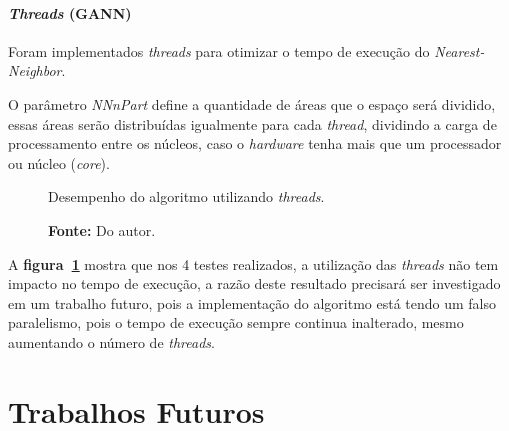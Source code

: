 \documentclass[12pt,openright,a4paper,twoside]{tcc}
\begin{document}
			\subsubsection{\textit{Threads} (GANN)}

			Foram implementados \textit{threads} para otimizar o tempo de execução do \textit{Nearest-Neighbor}. 

			O parâmetro \textit{NNnPart} define a quantidade de áreas que o espaço será dividido, essas áreas serão distribuídas igualmente para cada \textit{thread}, dividindo a carga de processamento entre os núcleos, caso o \textit{hardware} tenha mais que um processador ou núcleo (\textit{core}).

			\begin{figure}[h!]
				\centering
                \caption{Desempenho do algoritmo utilizando \textit{threads}.}
				\caption*{\textbf{Fonte:} Do autor.}
				\label{figthread}
			\end{figure}

			A \textbf{figura~\ref{figthread}} mostra que nos 4 testes realizados, a utilização das \textit{threads} não tem impacto no tempo de execução, a razão deste resultado precisará ser investigado em um trabalho futuro, pois a implementação do algoritmo está tendo um falso paralelismo, pois o tempo de execução sempre continua inalterado, mesmo aumentando o número de \textit{threads}.

			
	\chapter{Trabalhos Futuros}
\end{document}

